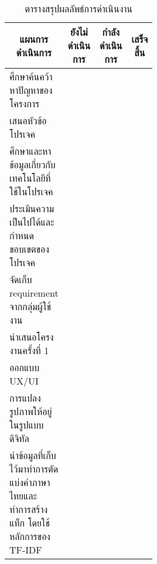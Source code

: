 \begin{table}[H]
\caption{ตารางสรุปผลลัพธ์การดำเนินงาน}\label{tbl:milestone}
\begin{tabular}{|p{0.5\linewidth}|l|l|l|}
\hline
\multicolumn{1}{|c|}{แผนการดำเนินการ}                                                & \multicolumn{1}{c|}{ยังไม่ดำเนินการ} & \multicolumn{1}{c|}{กำลังดำเนินการ} & \multicolumn{1}{c|}{เสร็จสิ้น} \\ \hline
ศึกษาค้นคว้าหาปัญหาของโครงการ                                                        &                                      &                                     & \cellcolor[HTML]{92D050}       \\ \hline
เสนอหัวข้อโปรเจค                                                                     &                                      &                                     & \cellcolor[HTML]{92D050}       \\ \hline
ศึกษาและหาข้อมูลเกี่ยวกับเทคโนโลยีที่ใช้ในโปรเจค                                     &                                      &                                     & \cellcolor[HTML]{92D050}       \\ \hline
ประเมินความเป็นไปได้และกำหนดขอบเขตของโปรเจค                                          &                                      &                                     & \cellcolor[HTML]{92D050}       \\ \hline
จัดเก็บ requirement จากกลุ่มผู้ใช้งาน                                                &                                      &                                     & \cellcolor[HTML]{92D050}       \\ \hline
นำเสนอโครงงานครั้งที่ 1                                                              &                                      &                                     & \cellcolor[HTML]{92D050}       \\ \hline
ออกแบบ UX/UI                                                                         &                                      &                                     & \cellcolor[HTML]{92D050}       \\ \hline
การแปลงรูปภาพให้อยู่ในรูปแบบดิจิทัล                                                        &                                      &                                     & \cellcolor[HTML]{92D050}       \\ \hline
นำข้อมูลที่เก็บไว้มาทำการตัดแบ่งคำภาษาไทยและทำการสร้างแท็ก โดยใช้หลักการของ TF-IDF &                                      &                                     & \cellcolor[HTML]{92D050}       \\ \hline

\end{tabular}
\end{table}
